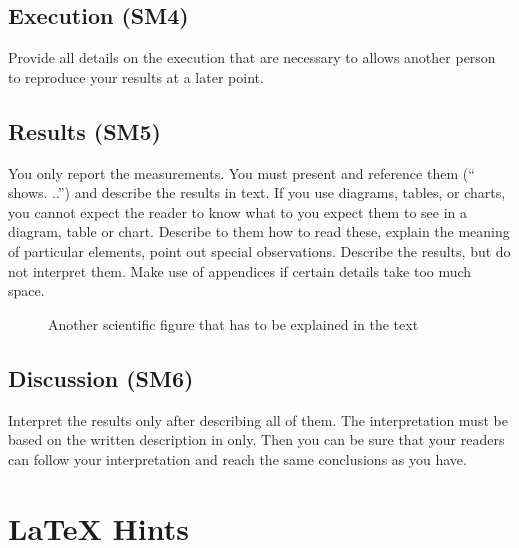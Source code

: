 \section{Execution (SM4)}\label{sec:evaluation:execution}

Provide all details on the execution that are necessary to allows another person to reproduce your results at a later point.

\section{Results (SM5)}\label{sec:evaluation:results}

You only report the measurements.
You must present and reference them (`` shows.
..'') and describe the results in text.
If you use diagrams, tables, or charts, you cannot expect the reader to know what to you expect them to see in a diagram, table or chart.
Describe to them how to read these, explain the meaning of particular elements, point out special observations.
Describe the results, but do not interpret them.
Make use of appendices if certain details take too much space.

\begin{figure}
  \centering
  \caption{Another scientific figure that has to be explained in the text}
  \label{fig:my_label2}
\end{figure}

\section{Discussion (SM6)}\label{sec:evaluation:discussion}

Interpret the results only after describing all of them.
The interpretation must be based on the written description in  only.
Then you can be sure that your readers can follow your interpretation and reach the same conclusions as you have.


\chapter{LaTeX Hints}
\label{sec:latexhints}

